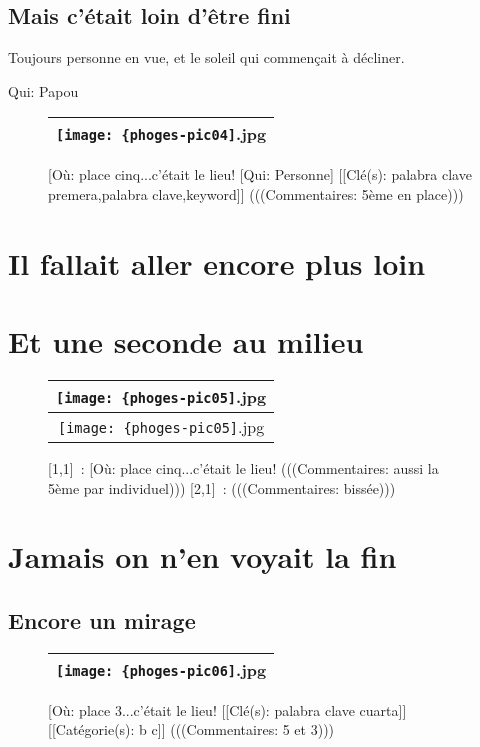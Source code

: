 \documentclass[12pt,twocolumn,french]{article}
\begin{document}
\subsection{Mais c'était loin d'être fini}
%

Toujours personne en vue, et le soleil qui commençait à décliner.


Qui: Papou

  \begin{figure}[H]
    \caption{
       [Où: place cinq...c'était le lieu!
       [Qui: Personne] 
      [[Clé(s): palabra clave premera,palabra clave,keyword]] 
      (((Commentaires: 5ème en place)))
    }
    \vspace{4mm}
    \label{phoges-pic04.jpg}
    \noindent \centering{}
    \begin{tabular}{|c|}
      \hline
          \texttt{[image: \{phoges-pic04]}.jpg}
        \tabularnewline \hline
    \end{tabular}
  \end{figure}
 \onecolumn
%
\section{Il fallait aller encore plus loin}
%

 \section*{Et une seconde au milieu}
  \begin{figure}[H]
    \caption{
      [1,1]~: 
       [Où: place cinq...c'était le lieu!
      (((Commentaires: aussi la 5ème par individuel)))
      [2,1]~: 
      (((Commentaires: bissée)))
    }
    \vspace{4mm}
    \label{phoges-pic05.jpg}
    \noindent \centering{}
    \begin{tabular}{|c|}
      \hline
          \texttt{[image: \{phoges-pic05]}.jpg}
        \tabularnewline \hline
          \texttt{[image: \{phoges-pic05]}.jpg}
        \tabularnewline \hline
    \end{tabular}
  \end{figure}
 \twocolumn
%
\section{Jamais on n'en voyait la fin}
%
%
\subsection{Encore un mirage}
%
  \begin{figure}[H]
    \caption{
       [Où: place 3...c'était le lieu!
      [[Clé(s): palabra clave cuarta]] 
      [[Catégorie(s): b c]] 
      (((Commentaires: 5 et 3)))
    }
    \vspace{4mm}
    \label{phoges-pic06.jpg}
    \noindent \centering{}
    \begin{tabular}{|c|}
      \hline
          \texttt{[image: \{phoges-pic06]}.jpg}
        \tabularnewline \hline
    \end{tabular}
  \end{figure}
%
\end{document}
